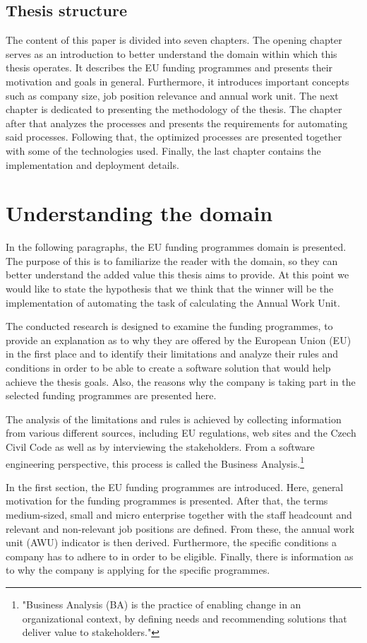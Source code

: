\documentclass[12pt,oneside]{fithesis2}
\begin{document}
\section{Thesis structure}
The content of this paper is divided into seven chapters. The opening chapter serves as an introduction to better understand the domain within which this thesis operates. It describes the EU funding programmes and presents their motivation and goals in general. Furthermore, it introduces important concepts such as company size, job position relevance and annual work unit. The next chapter is dedicated to presenting the methodology of the thesis. The chapter after that analyzes the processes and presents the requirements for automating said processes. Following that, the optimized processes are presented together with some of the technologies used. Finally, the last chapter contains the implementation and deployment details.
\chapter{Understanding the domain}\label{hypothesis}
In the following paragraphs, the EU funding programmes domain is presented. The purpose of this is to familiarize the reader with the domain, so they can better understand the added value this thesis aims to provide. At this point we would like to state the hypothesis that we think that the winner will be the implementation of automating the task of calculating the Annual Work Unit.
\par
The conducted research is designed to examine the funding programmes, to provide an explanation as to why they are offered by the European Union (EU) in the first place and to identify their limitations and analyze their rules and conditions in order to be able to create a software solution that would help achieve the thesis goals. Also, the reasons why the company is taking part in the selected funding programmes are presented here.
\par
The analysis of the limitations and rules is achieved by collecting information from various different sources, including EU regulations, web sites and the Czech Civil Code as well as by interviewing the stakeholders. From a software engineering perspective, this process is called the Business Analysis.\footnote{"Business Analysis (BA) is the practice of enabling change in an organizational context, by defining needs and recommending solutions that deliver value to stakeholders."\cite{business-analysis}}
\par
In the first section, the EU funding programmes are introduced. Here, general motivation for the funding programmes is presented. After that, the terms medium-sized, small and micro enterprise together with the staff headcount and relevant and non-relevant job positions are defined. From these, the annual work unit (AWU) indicator is then derived. Furthermore, the specific conditions a company has to adhere to in order to be eligible. Finally, there is information as to why the company is applying for the specific programmes.
\newpage
\end{document}
